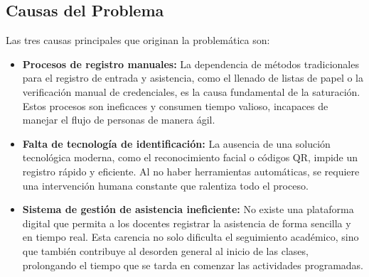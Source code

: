 \subsection{Causas del Problema}
Las tres causas principales que originan la problemática son:
\begin{itemize}
    \item \textbf{Procesos de registro manuales:} La dependencia de métodos tradicionales para el registro de entrada y asistencia, como el llenado de listas de papel o la verificación manual de credenciales, es la causa fundamental de la saturación. Estos procesos son ineficaces y consumen tiempo valioso, incapaces de manejar el flujo de personas de manera ágil.
    \item \textbf{Falta de tecnología de identificación:} La ausencia de una solución tecnológica moderna, como el reconocimiento facial o códigos QR, impide un registro rápido y eficiente. Al no haber herramientas automáticas, se requiere una intervención humana constante que ralentiza todo el proceso.
    \item \textbf{Sistema de gestión de asistencia ineficiente:} No existe una plataforma digital que permita a los docentes registrar la asistencia de forma sencilla y en tiempo real. Esta carencia no solo dificulta el seguimiento académico, sino que también contribuye al desorden general al inicio de las clases, prolongando el tiempo que se tarda en comenzar las actividades programadas.
\end{itemize}